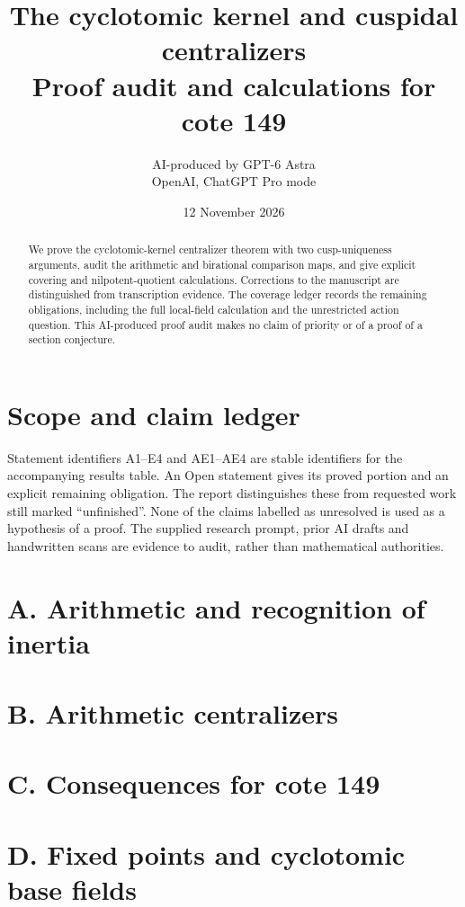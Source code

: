 \documentclass[11pt,a4paper]{article}
\title{The cyclotomic kernel and cuspidal centralizers\\\large Proof audit and calculations for cote 149}
\author{AI-produced by GPT-6 Astra\\OpenAI, ChatGPT Pro mode}
\date{12 November 2026}
\begin{document}
\maketitle
\begin{abstract}
We prove the cyclotomic-kernel centralizer theorem with two cusp-uniqueness arguments, audit the arithmetic and birational comparison maps, and give explicit covering and nilpotent-quotient calculations. Corrections to the manuscript are distinguished from transcription evidence. The coverage ledger records the remaining obligations, including the full local-field calculation and the unrestricted action question. This AI-produced proof audit makes no claim of priority or of a proof of a section conjecture.
\end{abstract}

\clearpage
\tableofcontents
\section{Scope and claim ledger}
Statement identifiers A1--E4 and AE1--AE4 are stable identifiers for the accompanying results table. An Open statement gives its proved portion and an explicit remaining obligation. The report distinguishes these from requested work still marked ``unfinished''. None of the claims labelled as unresolved is used as a hypothesis of a proof. The supplied research prompt, prior AI drafts and handwritten scans are evidence to audit, rather than mathematical authorities.
\section{A. Arithmetic and recognition of inertia}
\section{B. Arithmetic centralizers}
\section{C. Consequences for cote 149}
\section{D. Fixed points and cyclotomic base fields}
\end{document}
